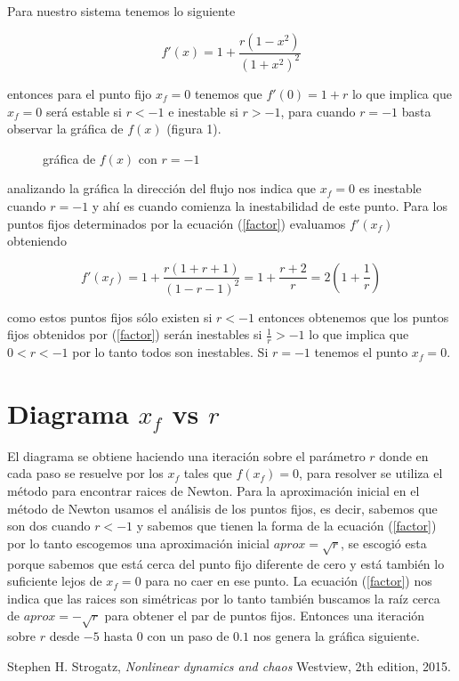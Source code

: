 \documentclass[10pt]{article}
\begin{document}
Para nuestro sistema tenemos lo siguiente

\begin{equation}
	f'(x)=1+\frac{r(1-x^2)}{(1+x^2)^2}
\label{spline}
\end{equation}

entonces para el punto fijo $x_f=0$ tenemos que $f'(0)=1+r$ lo que implica que $x_f=0$ ser\'a estable si $r<-1$ e inestable si $r>-1$, para 
cuando $r=-1$ basta observar la gr\'afica de $f(x)$ (figura 1). 

\begin{figure}[h]
\begin{center}
	
\caption{gr\'afica de $f(x)$ con $r=-1$}
\end{center}
\end{figure}

analizando la gr\'afica la direcci\'on del flujo nos indica que $x_f=0$ es 
inestable cuando $r=-1$ y ah\'i es cuando comienza la inestabilidad de este 
punto. Para los puntos fijos 
determinados por la ecuaci\'on (\ref{factor}) evaluamos $f'(x_f)$ 
obteniendo

\begin{equation}
	f'(x_f)=1+\frac{r(1+r+1)}{(1-r-1)^2}=1+\frac{r+2}{r}=2(1+\frac{1}{r})	
\label{est}
\end{equation}

como estos puntos fijos s\'olo existen si $r<-1$ entonces obtenemos que los puntos fijos obtenidos por (\ref{factor}) ser\'an 
inestables si $\frac{1}{r}>-1$ lo que implica que $0<r<-1$ por lo tanto todos son inestables. Si $r=-1$ tenemos el punto $x_f=0$.

\section{Diagrama $x_f$ vs $r$}
El diagrama se obtiene haciendo una iteraci\'on sobre el par\'ametro $r$ donde en 
cada paso se resuelve por los $x_f$ tales que $f(x_f)=0$, para resolver se 
utiliza el m\'etodo para encontrar raices de Newton. Para la aproximaci\'on 
inicial en el m\'etodo de Newton usamos el an\'alisis de los 
puntos fijos, es decir, sabemos que son dos cuando $r<-1$ y sabemos que tienen la 
forma de la ecuaci\'on (\ref{factor}) por lo tanto escogemos una 
aproximaci\'on inicial $aprox=\sqrt{r}$, se escogi\'o esta porque sabemos que 
est\'a cerca del punto fijo diferente de cero y est\'a tambi\'en lo suficiente 
lejos de $x_f=0$ para no caer en ese punto. La ecuaci\'on (\ref{factor}) nos 
indica que las raices son sim\'etricas por lo tanto tambi\'en buscamos la ra\'iz 
cerca de $aprox=-\sqrt{r}$ para obtener el par de puntos fijos. Entonces una 
iteraci\'on sobre $r$ desde $-5$ hasta $0$ con un paso de $0.1$ nos genera la 
gr\'afica siguiente.
 
\begin{figure}[h]
\begin{center}
	
\end{center}
\end{figure}


\begin{thebibliography}{9}
	Stephen H. Strogatz,
	\emph{Nonlinear dynamics and chaos}
	Westview, 2th edition, 2015.
\end{thebibliography}
\end{document}
